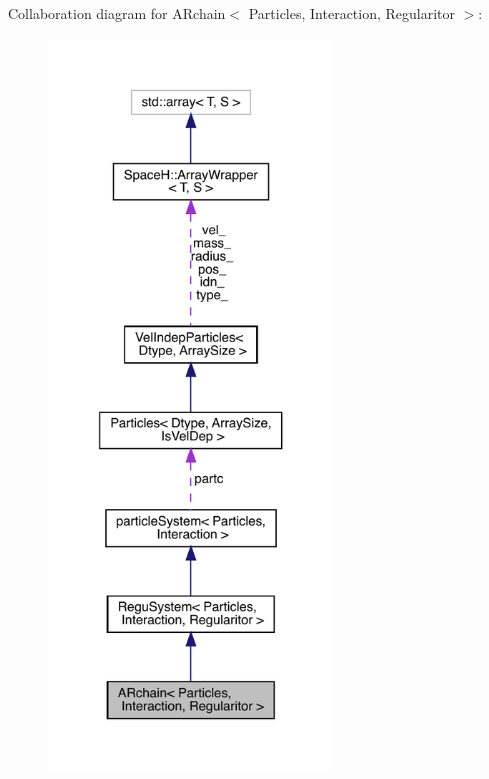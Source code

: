 Collaboration diagram for A\+Rchain$<$ Particles, Interaction, Regularitor $>$\+:
\nopagebreak
\begin{figure}[H]
\begin{center}
\leavevmode
\includegraphics[height=550pt]{class_a_rchain__coll__graph}
\end{center}
\end{figure}
